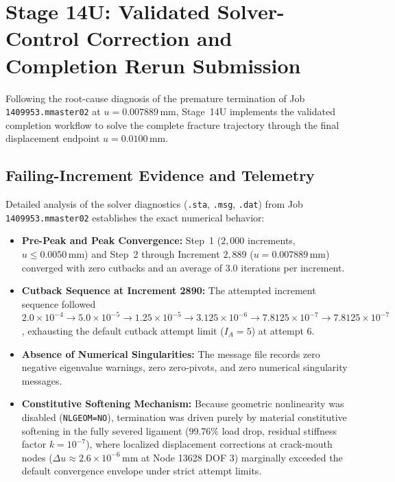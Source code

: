 \section{Stage 14U: Validated Solver-Control Correction and Completion Rerun Submission}
\label{sec:stage14u_completion_solve}

Following the root-cause diagnosis of the premature termination of Job \texttt{1409953.mmaster02} at $u = 0.007889\,\mathrm{mm}$, Stage~14U implements the validated completion workflow to solve the complete fracture trajectory through the final displacement endpoint $u = 0.0100\,\mathrm{mm}$.

\subsection{Failing-Increment Evidence and Telemetry}
\label{subsec:stage14u_telemetry}

Detailed analysis of the solver diagnostics (\texttt{.sta}, \texttt{.msg}, \texttt{.dat}) from Job \texttt{1409953.mmaster02} establishes the exact numerical behavior:
\begin{itemize}
    \item \textbf{Pre-Peak and Peak Convergence:} Step~1 ($2{,}000$ increments, $u \le 0.0050\,\mathrm{mm}$) and Step~2 through Increment $2{,}889$ ($u = 0.007889\,\mathrm{mm}$) converged with zero cutbacks and an average of $3.0$ iterations per increment.
    \item \textbf{Cutback Sequence at Increment 2890:} The attempted increment sequence followed $2.0\times 10^{-4} \to 5.0\times 10^{-5} \to 1.25\times 10^{-5} \to 3.125\times 10^{-6} \to 7.8125\times 10^{-7} \to 7.8125\times 10^{-7}$, exhausting the default cutback attempt limit ($I_A = 5$) at attempt 6.
    \item \textbf{Absence of Numerical Singularities:} The message file records zero negative eigenvalue warnings, zero zero-pivots, and zero numerical singularity messages.
    \item \textbf{Constitutive Softening Mechanism:} Because geometric nonlinearity was disabled (\texttt{NLGEOM=NO}), termination was driven purely by material constitutive softening in the fully severed ligament ($99.76\%$ load drop, residual stiffness factor $k = 10^{-7}$), where localized displacement corrections at crack-mouth nodes ($\Delta u \approx 2.6\times 10^{-6}\,\mathrm{mm}$ at Node 13628 DOF 3) marginally exceeded the default convergence envelope under strict attempt limits.
\end{itemize}

